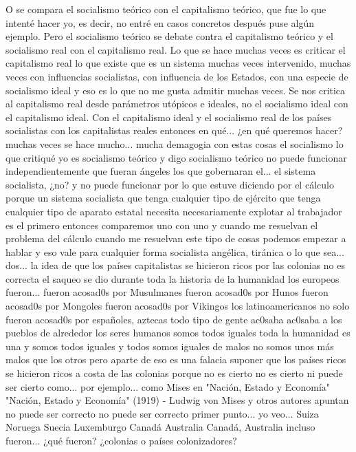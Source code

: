 O se compara el socialismo teórico con el capitalismo teórico, que fue lo que intenté hacer yo, es decir, no entré en casos concretos después puse algún ejemplo. Pero el socialismo teórico se debate contra el capitalismo teórico y el socialismo real con el capitalismo real. Lo que se hace muchas veces es criticar el capitalismo real lo que existe que es un sistema muchas veces intervenido, muchas veces con influencias socialistas, con influencia de los Estados, con una especie de socialismo ideal y eso es lo que no me gusta admitir muchas veces. Se nos critica al capitalismo real desde parámetros utópicos e ideales, no el socialismo ideal con el capitalismo ideal. Con el capitalismo ideal y el socialismo real de los países socialistas con los capitalistas reales entonces en qué... ¿en qué queremos hacer?
muchas veces se hace mucho... mucha demagogia con estas cosas el socialismo lo que critiqué yo es socialismo teórico
y digo socialismo teórico no puede funcionar independientemente que fueran ángeles los que gobernaran el...
el sistema socialista, ¿no? y no puede funcionar por lo que estuve diciendo por el cálculo porque un sistema socialista
que tenga cualquier tipo de ejército que tenga cualquier tipo de aparato estatal necesita necesariamente explotar al trabajador es el primero
entonces comparemos uno con uno y cuando me resuelvan el problema del cálculo cuando me resuelvan este tipo de cosas podemos empezar a hablar
y eso vale para cualquier forma socialista angélica, tiránica o lo que sea...
dos... la idea de que los países capitalistas se hicieron ricos por las colonias no es correcta
el saqueo se dio durante toda la historia de la humanidad los europeos fueron... fueron acosad0s por Musulmanes
fueron acosad0s por Hunos fueron acosad0s por Mongoles fueron acosad0s por Vikingos
los latinoamericanos no solo fueron acosad0s por españoles, aztecas todo tipo de gente ac0saba ac0saba a los pueblos de alrededor
los seres humanos somos todos iguales toda la humanidad es una y somos todos iguales y todos somos iguales de malos no somos unos más malos que los otros
pero aparte de eso es una falacia suponer que los países ricos se hicieron ricos a costa de las colonias
porque no es cierto no es cierto ni puede ser cierto como... por ejemplo... como Mises en "Nación, Estado y Economía"
"Nación, Estado y Economía" (1919) - Ludwig von Mises
y otros autores apuntan no puede ser correcto no puede ser correcto primer punto...
yo veo... Suiza Noruega
Suecia Luxemburgo Canadá
Australia Canadá, Australia incluso fueron... ¿qué fueron? ¿colonias o países colonizadores?
